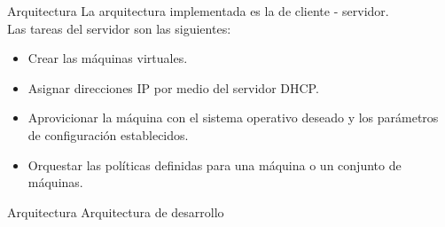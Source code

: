\begin{frame}{Arquitectura}
    \vspace{-1.5cm}
    La arquitectura implementada es la de cliente - servidor. 
    \\
    Las tareas del servidor son las siguientes:
    \begin{itemize}
        \item Crear las máquinas virtuales.
        \item Asignar direcciones IP por medio del servidor DHCP.
        \item Aprovicionar la máquina con el sistema operativo deseado y los parámetros de configuración establecidos.
        \item Orquestar las políticas definidas para una máquina o un conjunto de máquinas.
    \end{itemize}

\end{frame}

\begin{frame}{Arquitectura}
    \vspace{0cm} {Arquitectura de desarrollo}
    \vspace{0.5cm}
    \begin{figure}[ht]
       \centering
       \vspace{-0.50cm}
    \end{figure}

\end{frame}


